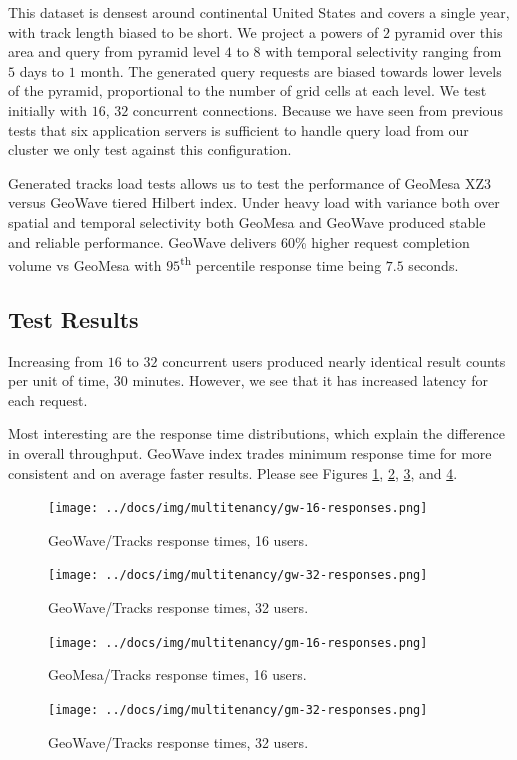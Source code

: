 This dataset is densest around continental United States and covers a single year, with track length biased to be short.
We project a powers of $2$ pyramid over this area and query from pyramid level $4$ to $8$ with temporal selectivity ranging from $5$ days to $1$ month.
The generated query requests are biased towards lower levels of the pyramid, proportional to the number of grid cells at each level.
We test initially with $16$, $32$ concurrent connections.
Because we have seen from previous tests that six application servers is sufficient to handle query load from our cluster we only test against this configuration.

Generated tracks load tests allows us to test the performance of GeoMesa XZ3 versus GeoWave tiered Hilbert index.
Under heavy load with variance both over spatial and temporal selectivity both GeoMesa and GeoWave produced stable and reliable performance.
GeoWave delivers $60$\% higher request completion volume vs GeoMesa with $95$\textsuperscript{th} percentile response time being $7.5$ seconds.

\subsection{Test Results}

Increasing from $16$ to $32$ concurrent users produced nearly identical result counts per unit of time, $30$ minutes.
However, we see that it has increased latency for each request.

Most interesting are the response time distributions, which explain the difference in overall throughput.
GeoWave index trades minimum response time for more consistent and on average faster results.
Please see Figures \ref{geowave16}, \ref{geowave32}, \ref{geomesa16}, and \ref{geomesa32}.

\begin{figure}[h!tb]
  \centering
  \texttt{[image: ../docs/img/multitenancy/gw-16-responses.png]}
  \caption{GeoWave/Tracks response times, 16 users.}
  \label{geowave16}
\end{figure}

\begin{figure}[h!tb]
  \centering
  \texttt{[image: ../docs/img/multitenancy/gw-32-responses.png]}
  \caption{GeoWave/Tracks response times, 32 users.}
  \label{geowave32}
\end{figure}

\begin{figure}[h!tb]
  \centering
  \texttt{[image: ../docs/img/multitenancy/gm-16-responses.png]}
  \caption{GeoMesa/Tracks response times, 16 users.}
  \label{geomesa16}
\end{figure}

\begin{figure}[h!tb]
  \centering
  \texttt{[image: ../docs/img/multitenancy/gm-32-responses.png]}
  \caption{GeoWave/Tracks response times, 32 users.}
  \label{geomesa32}
\end{figure}

